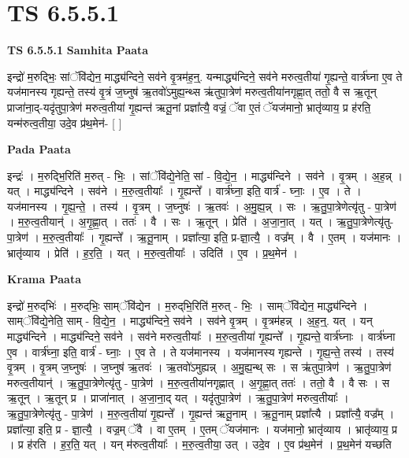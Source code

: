 \documentclass[17pt]{extarticle}
\begin{document}
\section{ TS 6.5.5.1 }

\textbf{TS 6.5.5.1 } \newline
\textbf{Samhita Paata} \newline

इन्द्रो॑ म॒रुद्भिः॒ सांॅवि॑द्येन॒ माद्ध्य॑न्दिने॒ सव॑ने वृ॒त्रम॑ह॒न्॒. यन्माद्ध्य॑न्दिने॒ सव॑ने मरुत्व॒तीया॑ गृ॒ह्यन्ते॒ वार्त्र॑घ्ना ए॒व ते यज॑मानस्य गृह्यन्ते॒ तस्य॑ वृ॒त्रं ज॒घ्नुष॑ ऋ॒तवो॑ऽमुह्य॒न्थ्स ऋ॑तुपा॒त्रेण॑ मरुत्व॒तीया॑नगृह्णा॒त् ततो॒ वै स ऋ॒तून् प्राजा॑ना॒द्-यदृ॑तुपा॒त्रेण॑ मरुत्व॒तीया॑ गृ॒ह्यन्त॑ ऋतू॒नां प्रज्ञा᳚त्यै॒ वज्रं॒ ॅवा ए॒तं ॅयज॑मानो॒ भ्रातृ॑व्याय॒ प्र ह॑रति॒ यन्म॑रुत्व॒तीया॒ उदे॒व प्र॑थ॒मेन॑- [  ] \newline

\textbf{Pada Paata} \newline

इन्द्रः॑ । म॒रुद्भि॒रिति॑ म॒रुत् - भिः॒ । सांॅवि॑द्ये॒नेति॒ सां - वि॒द्ये॒न॒ । माद्ध्य॑न्दिने । सव॑ने । वृ॒त्रम् । अ॒ह॒न्न् । यत् । माद्ध्य॑न्दिने । सव॑ने । म॒रु॒त्व॒तीयाः᳚ । गृ॒ह्यन्ते᳚ । वार्त्र॑घ्ना॒ इति॒ वार्त्र॑ - घ्नाः॒ । ए॒व । ते । यज॑मानस्य । गृ॒ह्य॒न्ते॒ । तस्य॑ । वृ॒त्रम् । ज॒घ्नुषः॑ । ऋ॒तवः॑ । अ॒मु॒ह्य॒न्न् । सः । ऋ॒तु॒पा॒त्रेणेत्यृ॑तु - पा॒त्रेण॑ । म॒रु॒त्व॒तीयान्॑ । अ॒गृ॒ह्णा॒त् । ततः॑ । वै । सः । ऋ॒तून् । प्रेति॑ । अ॒जा॒ना॒त् । यत् । ऋ॒तु॒पा॒त्रेणेत्यृ॑तु-पा॒त्रेण॑ । म॒रु॒त्व॒तीयाः᳚ । गृ॒ह्यन्ते᳚ । ऋ॒तू॒नाम् । प्रज्ञा᳚त्या॒ इति॒ प्र-ज्ञा॒त्यै॒ । वज्र᳚म् । वै । ए॒तम् । यज॑मानः । भ्रातृ॑व्याय । प्रेति॑ । ह॒र॒ति॒ । यत् । म॒रु॒त्व॒तीयाः᳚ । उदिति॑ । ए॒व । प्र॒थ॒मेन॑ ।  \newline


\textbf{Krama Paata} \newline

इन्द्रो॑ म॒रुद्‌भिः॑ । म॒रुद्‌भिः॒ साम्ॅवि॑द्येन । म॒रुद्‌भि॒रिति॑ म॒रुत् - भिः॒ । साम्ॅवि॑द्येन॒ माद्ध्य॑न्दिने । साम्ॅवि॑द्ये॒नेति॒ साम् - वि॒द्ये॒न॒ । माद्ध्य॑न्दिने॒ सव॑ने । सव॑ने वृ॒त्रम् । वृ॒त्रम॑हन्न् । अ॒ह॒न्॒. यत् । यन् माद्ध्य॑न्दिने । माद्ध्य॑न्दिने॒ सव॑ने । सव॑ने मरुत्व॒तीयाः᳚ । म॒रु॒त्व॒तीया॑ गृ॒ह्यन्ते᳚ । गृ॒ह्यन्ते॒ वार्त्र॑घ्नाः । वार्त्र॑घ्ना ए॒व । वार्त्र॑घ्ना॒ इति॒ वार्त्र॑ - घ्नाः॒ । ए॒व ते । ते यज॑मानस्य । यज॑मानस्य गृह्यन्ते । गृ॒ह्य॒न्ते॒ तस्य॑ । तस्य॑ वृ॒त्रम् । वृ॒त्रम् ज॒घ्नुषः॑ । ज॒घ्नुष॑ ऋ॒तवः॑ । ऋ॒तवो॑ऽमुह्यन्न् । अ॒मु॒ह्य॒न्थ् सः । स ऋ॑तुपा॒त्रेण॑ । ऋ॒तु॒पा॒त्रेण॑ मरुत्व॒तीयान्॑ । ऋ॒तु॒पा॒त्रेणेत्यृ॑तु - पा॒त्रेण॑ । म॒रु॒त्व॒तीया॑नगृह्णात् । अ॒गृ॒ह्णा॒त् ततः॑ । ततो॒ वै । वै सः । स ऋ॒तून् । ऋ॒तून् प्र । प्राजा॑नात् । अ॒जा॒ना॒द् यत् । यदृ॑तुपा॒त्रेण॑ । ऋ॒तु॒पा॒त्रेण॑ मरुत्व॒तीयाः᳚ । ऋ॒तु॒पा॒त्रेणेत्यृ॑तु - पा॒त्रेण॑ । म॒रु॒त्व॒तीया॑ गृ॒ह्यन्ते᳚ । गृ॒ह्यन्त॑ ऋतू॒नाम् । ऋ॒तू॒नाम् प्रज्ञा᳚त्यै । प्रज्ञा᳚त्यै॒ वज्र᳚म् । प्रज्ञा᳚त्या॒ इति॒ प्र - ज्ञा॒त्यै॒ । वज्र॒म् ॅवै । वा ए॒तम् । ए॒तम् ॅयज॑मानः । यज॑मानो॒ भ्रातृ॑व्याय । भ्रातृ॑व्याय॒ प्र । प्र ह॑रति । ह॒र॒ति॒ यत् । यन् म॑रुत्व॒तीयाः᳚ । म॒रु॒त्व॒तीया॒ उत् । उदे॒व । ए॒व प्र॑थ॒मेन॑ । प्र॒थ॒मेन॑ यच्छति \newline
\end{document}
